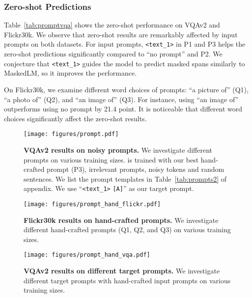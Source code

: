 \subsubsection{Zero-shot Predictions}
Table~\ref{tab:promptvqa} shows the zero-shot performance on VQAv2 and Flickr30k.
We observe that zero-shot results are remarkably affected by input prompts on both datasets.
For input prompts, \texttt{<text\_1>} in P1 and P3 helps the zero-shot predictions significantly compared to ``no prompt'' and P2.
We conjecture that \texttt{<text\_1>} guides the model to predict masked spans similarly to MaskedLM, so it improves the performance.

On Flickr30k, we examine different word choices of prompts: ``a picture of'' (Q1), ``a photo of'' (Q2), and ``an image of'' (Q3).
For instance, using ``an image of'' outperforms using no prompt by 21.4 point.
It is noticeable that different word choices significantly affect the zero-shot results.

\begin{figure}[tb!]
    \centering
    \texttt{[image: figures/prompt.pdf]}
    \caption{\textbf{VQAv2 results on noisy prompts.} We investigate different prompts on various training sizes. \method\xspace is trained with our best hand-crafted prompt (P3), irrelevant prompts, noisy tokens and random sentences. We list the prompt templates in Table~\ref{tab:prompts2} of appendix. We use ``\texttt{<text\_1>} \texttt{[A]}'' as our target prompt.}
    \label{fig:prompt}
\end{figure}


\begin{figure}[tb!]
    \centering
    \texttt{[image: figures/prompt\_hand\_flickr.pdf]}
    \caption{\textbf{Flickr30k results on hand-crafted prompts.}   We investigate different hand-crafted prompts (Q1, Q2, and Q3) on various training sizes. 
}
    \label{fig:handpromptflickr}
\end{figure}


\begin{figure}[tb!]
    \centering
    \texttt{[image: figures/prompt\_hand\_vqa.pdf]}
    \caption{\textbf{VQAv2 results on different target prompts.}  We investigate different target prompts with hand-crafted input prompts on various training sizes. 
}
    \label{fig:handpromptvqa}
\end{figure}


